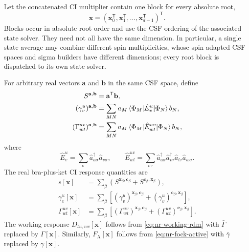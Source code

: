 \documentclass[aip,preprint,nofootinbib]{revtex4-1}
\newcommand{\act}{\mathrm{A}}
\begin{document}
Let the concatenated CI multiplier contain one block for every absolute root,
\begin{equation}
 \mathbf x=(\mathbf x_0^{\mathsf T},\mathbf x_1^{\mathsf T},\ldots,
 \mathbf x_{d-1}^{\mathsf T})^{\mathsf T}.
 \label{eq:nr-ci-layout}
\end{equation}
Blocks occur in absolute-root order and use the CSF ordering of the associated
state solver.  They need not all have the same dimension.  In particular, a
single state average may combine different spin multiplicities, whose
spin-adapted CSF spaces and sigma builders have different dimensions; every
root block is dispatched to its own state solver.

For arbitrary real vectors $\mathbf a$ and $\mathbf b$ in the same CSF space,
define
\begin{align}
 S^{\mathbf a,\mathbf b}&=\mathbf a^{\mathsf T}\mathbf b,
 \\
 (\gamma^u_v)^{\mathbf a,\mathbf b}
 &=\sum_{MN}a_M\braket{\Phi_M|\hat E^u_v|\Phi_N}b_N,
 \\
 (\Gamma^{uv}_{wt})^{\mathbf a,\mathbf b}
 &=\sum_{MN}a_M\braket{\Phi_M|\hat E^{uv}_{wt}|\Phi_N}b_N,
\end{align}
where
\begin{equation}
 \hat E^u_v=\sum_\sigma\hat a^\dagger_{u\sigma}\hat a_{v\sigma},
 \qquad
 \hat E^{uv}_{wt}=\sum_{\sigma\tau}
 \hat a^\dagger_{u\sigma}\hat a^\dagger_{v\tau}
 \hat a_{t\tau}\hat a_{w\sigma}.
\end{equation}
The real bra-plus-ket CI response quantities are
\begin{align}
 s[\mathbf x]
 &=\sum_\beta\left(
 S^{\mathbf x_\beta,\mathbf c_\beta}
 +S^{\mathbf c_\beta,\mathbf x_\beta}\right),
 \label{eq:nr-ci-overlap-response}
 \\
 \gamma^u_v[\mathbf x]
 &=\sum_\beta\left[
 (\gamma^u_v)^{\mathbf x_\beta,\mathbf c_\beta}
 +(\gamma^u_v)^{\mathbf c_\beta,\mathbf x_\beta}\right],
 \\
 \Gamma^{uv}_{wt}[\mathbf x]
 &=\sum_\beta\left[
 (\Gamma^{uv}_{wt})^{\mathbf x_\beta,\mathbf c_\beta}
 +(\Gamma^{uv}_{wt})^{\mathbf c_\beta,\mathbf x_\beta}\right].
 \label{eq:nr-ci-rdm-response}
\end{align}
The working response $D_{tu,vw}[\mathbf x]$ follows from
\cref{eq:nr-working-rdm} with $\bar\Gamma$ replaced by
$\Gamma[\mathbf x]$.  Similarly, $F_{\act}[\mathbf x]$ follows from
\cref{eq:nr-fock-active} with $\bar\gamma$ replaced by
$\gamma[\mathbf x]$.
\end{document}
